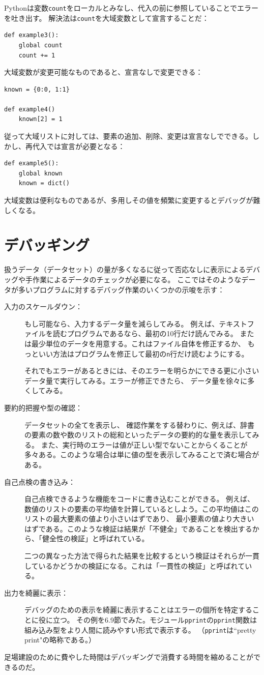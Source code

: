 \documentclass[a4j,12pt,makeidx]{jbook}
\begin{document}
Pythonは変数{\tt count}をローカルとみなし、代入の前に参照していることでエラーを吐き出す。
解決法は{\tt count}を大域変数として宣言することだ：
\begin{verbatim}
def example3():
    global count
    count += 1  
\end{verbatim} \par
大域変数が変更可能なものであると、宣言なしで変更できる：
\begin{verbatim}
known = {0:0, 1:1}

def example4()
    known[2] = 1
\end{verbatim}
従って大域リストに対しては、要素の追加、削除、変更は宣言なしでできる。しかし、再代入では宣言が必要となる：
\begin{verbatim}
def example5():
    global known
    known = dict()
\end{verbatim}
大域変数は便利なものであるが、多用しその値を頻繁に変更するとデバッグが難しくなる。
%
\section{デバッギング}
扱うデータ（データセット）の量が多くなるに従って否応なしに表示によるデバッグや手作業によるデータのチェックが必要になる。
ここではそのようなデータが多いプログラムに対するデバッグ作業のいくつかの示唆を示す： 
\begin{description}
\item[入力のスケールダウン：] もし可能なら、入力するデータ量を減らしてみる。
例えば、テキストファイルを読むプログラムであるなら、最初の10行だけ読んでみる。
または最少単位のデータを用意する。これはファイル自体を修正するか、
もっといい方法はプログラムを修正して最初の{\tt n}行だけ読むようにする。 \par
それでもエラーがあるときには、そのエラーを明らかにできる更に小さいデータ量で実行してみる。エラーが修正できたら、
データ量を徐々に多くしてみる。
\item[要約的把握や型の確認：] データセットの全てを表示し、
確認作業をする替わりに、例えば、辞書の要素の数や数のリストの総和といったデータの要約的な量を表示してみる。
また、実行時のエラーは値が正しい型でないことからくることが多々ある。このような場合は単に値の型を表示してみることで済む場合がある。
\item[自己点検の書き込み：] 自己点検できるような機能をコードに書き込むことができる。
例えば、数値のリストの要素の平均値を計算しているとしよう。この平均値はこのリストの最大要素の値より小さいはずであり、
最小要素の値より大きいはずである。このような検証は結果が「不健全」であることを検出するから、「健全性の検証」と呼ばれている。\par
二つの異なった方法で得られた結果を比較するという検証はそれらが一貫しているかどうかの検証になる。これは「一貫性の検証」と呼ばれている。
\item[出力を綺麗に表示：] デバッグのための表示を綺麗に表示することはエラーの個所を特定することに役に立つ。
その例を6.9節でみた。モジュール{\tt pprint}の{\tt pprint}関数は組み込み型をより人間に読みやすい形式で表示する。
（{\tt pprint}は``pretty print"の略称である。）
\end{description}
足場建設のために費やした時間はデバッギングで消費する時間を縮めることができるのだ。
%
\end{document}
